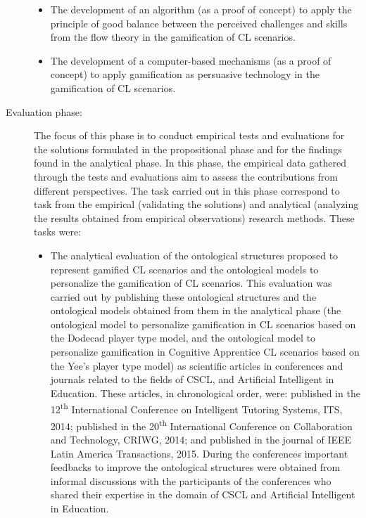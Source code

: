 \begin{description}
\begin{itemize}
\item
The development of an algorithm (as a proof of concept) to apply the principle of good balance between the perceived challenges and skills from the flow theory in the gamification of CL scenarios.

\item
The development of a computer-based mechanisms (as a proof of concept) to apply gamification as persuasive technology in the gamification of CL scenarios. 
\end{itemize}


\item[Evaluation phase:]
The focus of this phase is to conduct empirical tests and evaluations for the solutions formulated in the propositional phase and for the findings found in the analytical phase. In this phase, the empirical data gathered through the tests and evaluations aim to assess the contributions from different perspectives. The task carried out in this phase correspond to task from the empirical (validating the solutions) and analytical (analyzing the results obtained from empirical observations) research methods. These tasks were:

\begin{itemize}
\item
The analytical evaluation of the ontological structures proposed to represent gamified CL scenarios and the ontological models to personalize the gamification of CL scenarios. This evaluation was carried out by publishing these ontological structures and the ontological models obtained from them in the analytical phase (the ontological model to personalize gamification in CL scenarios based on the Dodecad player type model, and the ontological model to personalize gamification in Cognitive Apprentice CL scenarios based on the Yee's player type model) as scientific articles in conferences and journals related to the fields of CSCL, and Artificial Intelligent in Education. These articles, in chronological order, were:  published in the 12\textsuperscript{th} International Conference on Intelligent Tutoring Systems, ITS, 2014;  published in the 20\textsuperscript{th} International Conference on Collaboration and Technology, CRIWG, 2014; and  published in the journal of IEEE Latin America Transactions, 2015. During the conferences important feedbacks to improve the ontological structures were obtained from informal discussions with the participants of the conferences who shared their expertise in the domain of CSCL and Artificial Intelligent in Education.


\end{itemize}
\end{description}
